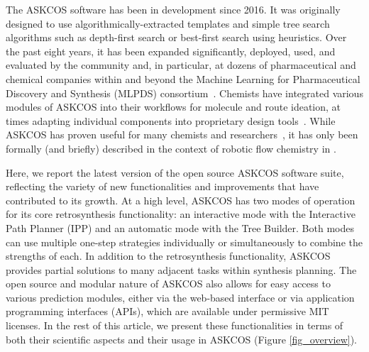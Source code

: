 \documentclass[pdflatex,sn-mathphys-num]{sn-jnl}%
\theoremstyle{thmstyleone}%
\theoremstyle{thmstyletwo}%
\theoremstyle{thmstylethree}%
\begin{document}
The ASKCOS software has been in development since 2016. It was originally designed to use algorithmically-extracted templates and simple tree search algorithms such as depth-first search or best-first search using heuristics. Over the past eight years, it has been expanded significantly, deployed, used, and evaluated by the community and, in particular, at dozens of pharmaceutical and chemical companies within and beyond the Machine Learning for Pharmaceutical Discovery and Synthesis (MLPDS) consortium~\citep{MLPDS}. Chemists have integrated various modules of ASKCOS into their workflows for molecule and route ideation, at times adapting individual components into proprietary design tools~\citep{struble_current_2020}. While ASKCOS has proven useful for many chemists and researchers~\citep{coley_robotic_2019,struble_current_2020,levin_merging_2022,soukaina_design_2024,avila_chemistry_2024,fromer_algorithmic_2024,sankaranarayanan_computer-assisted_2023,koscher_autonomous_2023,nambiar_bayesian_2022,mahjour_ideation_2024,seierstad_novel_2021,qi_optimized_2023,pasquini2023linchemin}, it has only been formally (and briefly) described in the context of robotic flow chemistry in \citet{coley_robotic_2019}.


Here, we report the latest version of the open source ASKCOS software suite, reflecting the variety of new functionalities and improvements that have contributed to its growth. At a high level, ASKCOS has two modes of operation for its core retrosynthesis functionality: an interactive mode with the Interactive Path Planner (IPP) and an automatic mode with the Tree Builder. Both modes can use multiple one-step strategies individually or simultaneously to combine the strengths of each. In addition to the retrosynthesis functionality, ASKCOS provides partial solutions to many adjacent tasks within synthesis planning. The open source and modular nature of ASKCOS also allows for easy access to various prediction modules, either via the web-based interface or via application programming interfaces (APIs), which are available under permissive MIT licenses. In the rest of this article, we present these functionalities in terms of both their scientific aspects and their usage in ASKCOS (Figure \ref{fig_overview}).
\end{document}
